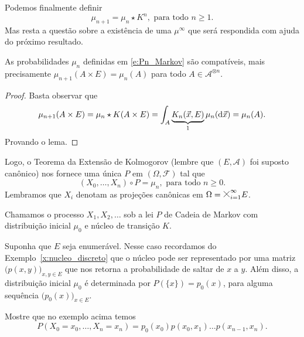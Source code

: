 \begin{topics}
Podemos finalmente definir
\begin{equation}
  \label{e:Pn_Markov}
  \mu_{n+1} = \mu_n \star K^n, \text{ para todo $n \geq 1$}.
\end{equation}
Mas resta a questão sobre a existência de uma $\mu^\infty$ que será respondida com ajuda do próximo resultado.

\begin{lemma}
  As probabilidades $\mu_n$ definidas em \eqref{e:Pn_Markov} são compatíveis, mais precisamente $\mu_{n+1}(A \times E) = \mu_n(A)$ para todo $A \in \mathcal{A}^{\otimes n}$.
\end{lemma}

\begin{proof}
  Basta observar que
  \begin{equation}
    \mu_{n+1}(A \times E) = \mu_n \star K (A \times E) = \int_{A} \underbrace{K_n (\vec{x}, E)}_1 \mu_n(\mathop{}\!\mathrm{d} \vec{x}) = \mu_n(A).
  \end{equation}
  Provando o lema.
\end{proof}

Logo, o Teorema da Extensão de Kolmogorov (lembre que $(E, \mathcal{A})$ foi suposto canônico) nos fornece uma única $P$ em $(\Omega, \mathcal{F})$ tal que
\begin{equation}
  (X_0, \dots, X_n) \circ P = \mu_n, \text{ para todo $n \geq 0$}.
\end{equation}
Lembramos que $X_i$ denotam as projeções canônicas em $\Omega = \mtimes_{i=1}^\infty E$.

Chamamos o processo $X_1, X_2, \dots$ sob a lei $P$ de Cadeia de Markov  com distribuição inicial $\mu_0$ e núcleo de transição $K$.

\begin{example}
  \label{x:Markov_p_xy}
  Suponha que $E$ seja enumerável.
  Nesse caso recordamos do Exemplo~\ref{x:nucleo_discreto} que o núcleo pode ser representado por uma matriz $\big(p(x,y)\big)_{x,y \in E}$ que nos retorna a probabilidade de saltar de $x$ a $y$.
  Além disso, a distribuição inicial $\mu_0$ é determinada por $P(\{x\}) = p_0(x)$, para alguma sequência $\big(p_0(x)\big)_{x \in E}$.
\end{example}

\begin{exercise}
  Mostre que no exemplo acima temos
  \begin{equation}
    P(X_0 = x_0, \dots, X_n = x_n) = p_0(x_0) p(x_0, x_1) \dots p(x_{n-1}, x_n).
  \end{equation}
\end{exercise}


\end{topics}
